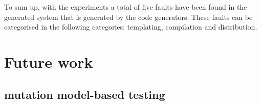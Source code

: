 To sum up, with the experiments a total of five faults have been found in the
generated system that is generated by the code generators.
These faults can be categorised in the following categories: templating,
compilation and distribution.

\section{Future work}

\subsection{mutation model-based testing}
